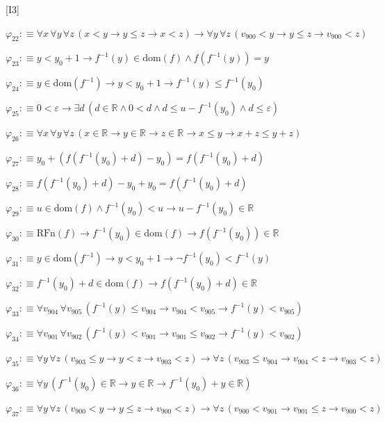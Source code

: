 \begin{fullproof}{[I3]}
\begin{abbrevlist}
\item $\varphi_{22} :\equiv \forall x\,\forall y\,\forall z\,(x < y \to y \leq z \to x < z) \to \forall y\,\forall z\,(v_{900} < y \to y \leq z \to v_{900} < z)$
\item $\varphi_{23} :\equiv y < y_{0} + 1 \to f^{-1}(y) \in \mathrm{dom}(f) \land f(f^{-1}(y)) = y$
\item $\varphi_{24} :\equiv y \in \mathrm{dom}(f^{-1}) \to y < y_{0} + 1 \to f^{-1}(y) \leq f^{-1}(y_{0})$
\item $\varphi_{25} :\equiv 0 < \varepsilon \to \exists d\,(d \in \mathbb{R} \land 0 < d \land d \leq u - f^{-1}(y_{0}) \land d \leq \varepsilon)$
\item $\varphi_{26} :\equiv \forall x\,\forall y\,\forall z\,(x \in \mathbb{R} \to y \in \mathbb{R} \to z \in \mathbb{R} \to x \leq y \to x + z \leq y + z)$
\item $\varphi_{27} :\equiv y_{0} + (f(f^{-1}(y_{0}) + d) - y_{0}) = f(f^{-1}(y_{0}) + d)$
\item $\varphi_{28} :\equiv f(f^{-1}(y_{0}) + d) - y_{0} + y_{0} = f(f^{-1}(y_{0}) + d)$
\item $\varphi_{29} :\equiv u \in \mathrm{dom}(f) \land f^{-1}(y_{0}) < u \to u - f^{-1}(y_{0}) \in \mathbb{R}$
\item $\varphi_{30} :\equiv \mathrm{RFn}(f) \to f^{-1}(y_{0}) \in \mathrm{dom}(f) \to f(f^{-1}(y_{0})) \in \mathbb{R}$
\item $\varphi_{31} :\equiv y \in \mathrm{dom}(f^{-1}) \to y < y_{0} + 1 \to \neg f^{-1}(y_{0}) < f^{-1}(y)$
\item $\varphi_{32} :\equiv f^{-1}(y_{0}) + d \in \mathrm{dom}(f) \to f(f^{-1}(y_{0}) + d) \in \mathbb{R}$
\item $\varphi_{33} :\equiv \forall v_{904}\,\forall v_{905}\,(f^{-1}(y) \leq v_{904} \to v_{904} < v_{905} \to f^{-1}(y) < v_{905})$
\item $\varphi_{34} :\equiv \forall v_{901}\,\forall v_{902}\,(f^{-1}(y) < v_{901} \to v_{901} \leq v_{902} \to f^{-1}(y) < v_{902})$
\item $\varphi_{35} :\equiv \forall y\,\forall z\,(v_{903} \leq y \to y < z \to v_{903} < z) \to \forall z\,(v_{903} \leq v_{904} \to v_{904} < z \to v_{903} < z)$
\item $\varphi_{36} :\equiv \forall y\,(f^{-1}(y_{0}) \in \mathbb{R} \to y \in \mathbb{R} \to f^{-1}(y_{0}) + y \in \mathbb{R})$
\item $\varphi_{37} :\equiv \forall y\,\forall z\,(v_{900} < y \to y \leq z \to v_{900} < z) \to \forall z\,(v_{900} < v_{901} \to v_{901} \leq z \to v_{900} < z)$

\end{abbrevlist}
\end{fullproof}
